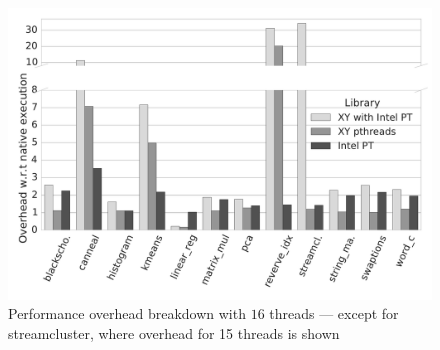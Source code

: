 
\begin{figure}[t]
\centering
\includegraphics[scale=0.25]{figure/benchmarks/times-16-threads.pdf}
\caption{Performance overhead breakdown with $16$ threads --- except for streamcluster, where overhead for 15 threads is shown}
\label{fig:overheads-breakdown}
\end{figure}
